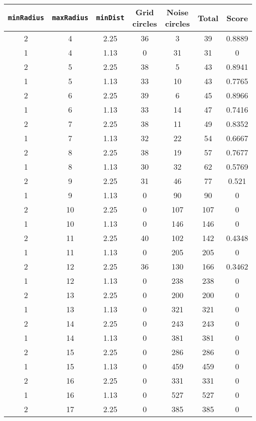 \documentclass[letterpaper, 12pt]{article}
\begin{document}
\begin{longtable}{|c|c|c|c|c|c|c|}
\hline
\textbf{\texttt{minRadius}} & \textbf{\texttt{maxRadius}} & \textbf{\texttt{minDist}} & \textbf{Grid circles} & \textbf{Noise circles} & \textbf{Total} & \textbf{Score} \\
\hline
2 & 4 & 2.25 & 36 & 3 & 39 & 0.8889 \\
\hline
1 & 4 & 1.13 & 0 & 31 & 31 & 0 \\
\hline
2 & 5 & 2.25 & 38 & 5 & 43 & 0.8941 \\
\hline
1 & 5 & 1.13 & 33 & 10 & 43 & 0.7765 \\
\hline
2 & 6 & 2.25 & 39 & 6 & 45 & 0.8966 \\
\hline
1 & 6 & 1.13 & 33 & 14 & 47 & 0.7416 \\
\hline
2 & 7 & 2.25 & 38 & 11 & 49 & 0.8352 \\
\hline
1 & 7 & 1.13 & 32 & 22 & 54 & 0.6667 \\
\hline
2 & 8 & 2.25 & 38 & 19 & 57 & 0.7677 \\
\hline
1 & 8 & 1.13 & 30 & 32 & 62 & 0.5769 \\
\hline
2 & 9 & 2.25 & 31 & 46 & 77 & 0.521 \\
\hline
1 & 9 & 1.13 & 0 & 90 & 90 & 0 \\
\hline
2 & 10 & 2.25 & 0 & 107 & 107 & 0 \\
\hline
1 & 10 & 1.13 & 0 & 146 & 146 & 0 \\
\hline
2 & 11 & 2.25 & 40 & 102 & 142 & 0.4348 \\
\hline
1 & 11 & 1.13 & 0 & 205 & 205 & 0 \\
\hline
2 & 12 & 2.25 & 36 & 130 & 166 & 0.3462 \\
\hline
1 & 12 & 1.13 & 0 & 238 & 238 & 0 \\
\hline
2 & 13 & 2.25 & 0 & 200 & 200 & 0 \\
\hline
1 & 13 & 1.13 & 0 & 321 & 321 & 0 \\
\hline
2 & 14 & 2.25 & 0 & 243 & 243 & 0 \\
\hline
1 & 14 & 1.13 & 0 & 381 & 381 & 0 \\
\hline
2 & 15 & 2.25 & 0 & 286 & 286 & 0 \\
\hline
1 & 15 & 1.13 & 0 & 459 & 459 & 0 \\
\hline
2 & 16 & 2.25 & 0 & 331 & 331 & 0 \\
\hline
1 & 16 & 1.13 & 0 & 527 & 527 & 0 \\
\hline
2 & 17 & 2.25 & 0 & 385 & 385 & 0 \\
\hline

\end{longtable}
\end{document}
